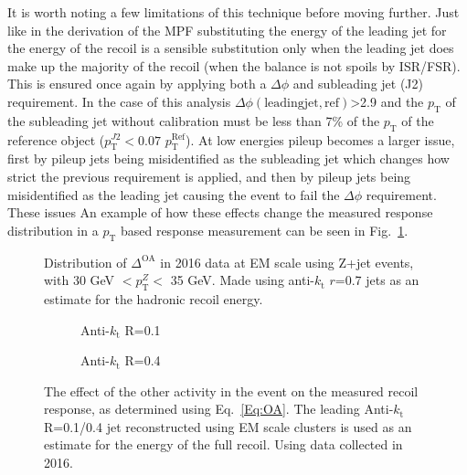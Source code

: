 It is worth noting a few limitations of this technique before moving further.  
Just like in the derivation of the MPF substituting the energy of the leading jet for the energy of the recoil is a sensible substitution only when the leading jet does make up the majority of the recoil (when the balance is not spoils by ISR/FSR).  
This is ensured once again by applying both a $\Delta\phi$ and subleading jet (J2) requirement.  
In the case of this analysis $\Delta\phi\left(\mathrm{leading jet, ref}\right)$>2.9 and the $p_{\mathrm T}$ of the subleading jet without calibration must be less than 7\% of the $p_{\mathrm T}$ of the reference object ($p_{\mathrm T}^{J2}<0.07$ $p_{\mathrm T}^{\mathrm{Ref}}$).  
At low energies pileup becomes a larger issue, first by pileup jets being misidentified as the subleading jet which changes how strict the previous requirement is applied, and then by pileup jets being misidentified as the leading jet causing the event to fail the $\Delta\phi$ requirement.  
These issues 
An example of how these effects change the measured response distribution in a $p_{\mathrm T}$ based response measurement can be seen in Fig.~\ref{Fig:BalDistExample}.  

\begin{figure}[!ht]
 \begin{center}
  \scalebox{0.55}{
   \texttt{[image: plots/Chap6/OtherActivity/Dists/OADist\_Cone7\_Bin3.eps]}
  }
 \end{center}
 \caption[Example $\Delta^{\mathrm{OA}}$ distribution]
 {\small Distribution of $\Delta^{\mathrm{OA}}$ in 2016 data at EM scale using Z+jet events, with 30 GeV $< p_{\mathrm T}^Z <$ 35 GeV.  Made using anti-$k_{\mathrm t}$ $r$=0.7 jets as an estimate for the hadronic recoil energy.  }
 \label{Fig:BalDistExample}
\end{figure}

\begin{figure}[!ht]
  \centering
  \begin{subfigure}{.5\textwidth}
    \centering
    \caption{Anti-$k_\mathrm{t}$ R=0.1}
  \end{subfigure}%
  \begin{subfigure}{.5\textwidth}  \centering
    \caption{Anti-$k_\mathrm{t}$ R=0.4}
  \end{subfigure}
  \caption[$\Delta^{\mathrm{OA}}$ using Anti-$k_\mathrm{t}$ R=0.1/0.4 jets]
{\small The effect of the other activity in the event on the measured recoil response, as determined using Eq.~\ref{Eq:OA}.  The leading Anti-$k_\mathrm{t}$ R=0.1/0.4 jet reconstructed using EM scale clusters is used as an estimate for the energy of the full recoil.  Using data collected in 2016.  }
  \label{Fig:OA_1-4}
\end{figure}



